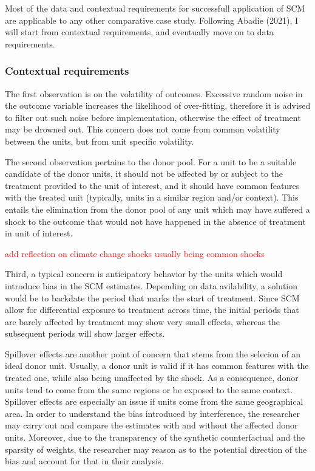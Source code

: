 \documentclass[12pt,a4paper,draft]{article}
\begin{document}
Most of the data and contextual requirements for successfull application of 
SCM are applicable to any other comparative case study. Following Abadie (2021), I 
will start from contextual requirements, and eventually move on to data requirements.

\subsubsection{Contextual requirements}

The first observation is on the volatility of outcomes. Excessive random noise in the 
outcome variable increases the likelihood of over-fitting, therefore it is advised to 
filter out such noise before implementation, otherwise the effect of treatment 
may be drowned out. This concern does not come from common volatility between the 
units, but from unit specific volatility.

The second observation pertains to the donor pool. For a unit to be a suitable 
candidate of the donor units, it should not be affected by or subject to the 
treatment provided to the unit of interest, and it should have common features 
with the treated unit (typically, units in a similar region and/or context). 
This entails the elimination from the 
donor pool of any unit which may have suffered a shock to the outcome that would 
not have happened in the absence of treatment in unit of interest.

\textcolor{red}{add reflection on climate change shocks usually being common shocks}

Third, a typical concern is anticipatory behavior by the units which would 
introduce bias in the SCM estimates. Depending on data avilability, a solution 
would be to backdate the period that marks the start of treatment. Since SCM allow 
for differential exposure to treatment across time, the initial periods that 
are barely affected by treatment may show very small effects, whereas the subsequent 
periods will show larger effects.

Spillover effects are another point of concern that stems from the selecion of 
an ideal donor unit. Usually, a donor unit is valid if it has common features 
with the treated one, while also being unaffected by the shock. As a consequence, 
donor units tend to come from the same regions or be exposed to the same 
context. Spillover effects are especially an issue if units come from the same 
geographical area. In order to understand the bias introduced by interference, 
the researcher may carry out and compare the estimates with and without the 
affected donor units. Moreover, due to the transparency of the synthetic 
counterfactual and the sparsity of weights, the researcher may reason as to the 
potential direction of the bias and account for that in their analysis.
\end{document}
